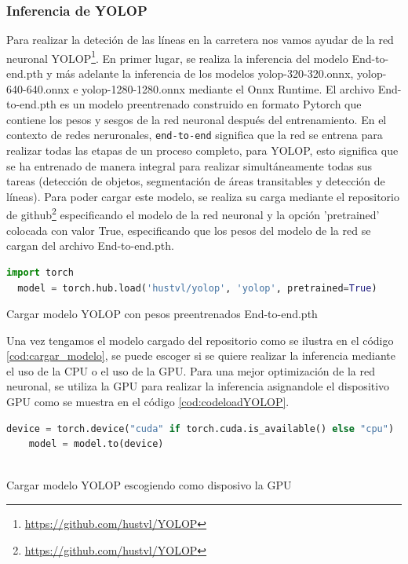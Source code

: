 \subsubsection{Inferencia de YOLOP}
\label{sec:Inferencia de YOLOP}

Para realizar la deteción de las líneas en la carretera nos vamos ayudar de la red neuronal YOLOP\footnote{\url{https://github.com/hustvl/YOLOP}}. En primer lugar, 
se realiza la inferencia del modelo End-to-end.pth y más adelante la inferencia de los modelos yolop-320-320.onnx, yolop-640-640.onnx e yolop-1280-1280.onnx mediante el Onnx Runtime. 
El archivo End-to-end.pth es un modelo preentrenado construido en formato Pytorch que contiene los pesos y sesgos de la red neuronal después del entrenamiento. En el contexto de 
redes neruronales, \texttt{end-to-end} significa que la red se entrena para realizar todas las etapas de un proceso completo, para YOLOP, esto significa que se ha entrenado de manera integral 
para realizar simultáneamente todas sus tareas (detección de objetos, segmentación de áreas transitables y detección de líneas). Para poder cargar este modelo, se realiza 
su carga mediante el repositorio de github\footnote{\url{https://github.com/hustvl/YOLOP}}
especificando el modelo de la red neuronal y la opción 'pretrained' colocada con valor True, especificando que los pesos del modelo de la red se cargan del archivo End-to-end.pth.\newline

\begin{code}[h]
  \begin{lstlisting}[language=Python]
  import torch
  model = torch.hub.load('hustvl/yolop', 'yolop', pretrained=True)

  \end{lstlisting}
  \caption[Cargar modelo YOLOP con pesos preentrenados End-to-end.pth]{Cargar modelo YOLOP con pesos preentrenados End-to-end.pth}
  \label{cod:cargar_modelo}
  \end{code}  

Una vez tengamos el modelo cargado del repositorio como se ilustra en el código \ref{cod:cargar_modelo}, se puede escoger 
si se quiere realizar la inferencia mediante el uso de la CPU o el uso de la GPU. Para una mejor optimización de la red neuronal, se utiliza
la GPU para realizar la inferencia asignandole el dispositivo GPU como se muestra en el código \ref{cod:codeloadYOLOP}.\newline

  
\begin{code}[h]
    \begin{lstlisting}[language=Python]
    device = torch.device("cuda" if torch.cuda.is_available() else "cpu")
    model = model.to(device)
  
    \end{lstlisting}
    \caption[Cargar modelo YOLOP escogiendo como disposivo la GPU]{Cargar modelo YOLOP escogiendo como disposivo la GPU}
    \label{cod:codeloadYOLOP}
    \end{code}  

